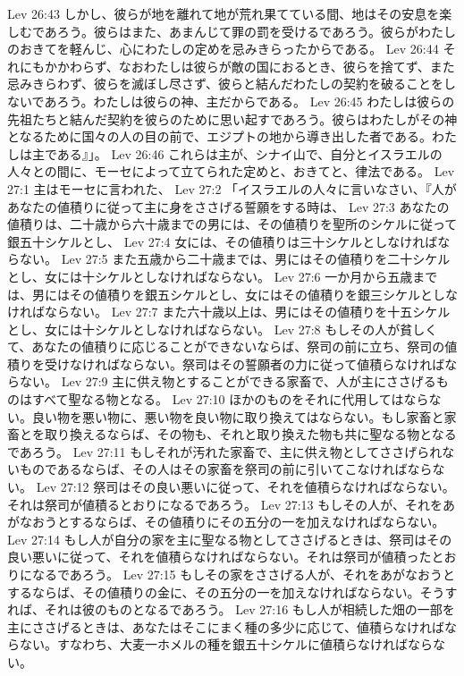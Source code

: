Lev 26:43  しかし、彼らが地を離れて地が荒れ果てている間、地はその安息を楽しむであろう。彼らはまた、あまんじて罪の罰を受けるであろう。彼らがわたしのおきてを軽んじ、心にわたしの定めを忌みきらったからである。
Lev 26:44  それにもかかわらず、なおわたしは彼らが敵の国におるとき、彼らを捨てず、また忌みきらわず、彼らを滅ぼし尽さず、彼らと結んだわたしの契約を破ることをしないであろう。わたしは彼らの神、主だからである。
Lev 26:45  わたしは彼らの先祖たちと結んだ契約を彼らのために思い起すであろう。彼らはわたしがその神となるために国々の人の目の前で、エジプトの地から導き出した者である。わたしは主である』」。
Lev 26:46  これらは主が、シナイ山で、自分とイスラエルの人々との間に、モーセによって立てられた定めと、おきてと、律法である。
Lev 27:1  主はモーセに言われた、
Lev 27:2  「イスラエルの人々に言いなさい、『人があなたの値積りに従って主に身をささげる誓願をする時は、
Lev 27:3  あなたの値積りは、二十歳から六十歳までの男には、その値積りを聖所のシケルに従って銀五十シケルとし、
Lev 27:4  女には、その値積りは三十シケルとしなければならない。
Lev 27:5  また五歳から二十歳までは、男にはその値積りを二十シケルとし、女には十シケルとしなければならない。
Lev 27:6  一か月から五歳までは、男にはその値積りを銀五シケルとし、女にはその値積りを銀三シケルとしなければならない。
Lev 27:7  また六十歳以上は、男にはその値積りを十五シケルとし、女には十シケルとしなければならない。
Lev 27:8  もしその人が貧しくて、あなたの値積りに応じることができないならば、祭司の前に立ち、祭司の値積りを受けなければならない。祭司はその誓願者の力に従って値積らなければならない。
Lev 27:9  主に供え物とすることができる家畜で、人が主にささげるものはすべて聖なる物となる。
Lev 27:10  ほかのものをそれに代用してはならない。良い物を悪い物に、悪い物を良い物に取り換えてはならない。もし家畜と家畜とを取り換えるならば、その物も、それと取り換えた物も共に聖なる物となるであろう。
Lev 27:11  もしそれが汚れた家畜で、主に供え物としてささげられないものであるならば、その人はその家畜を祭司の前に引いてこなければならない。
Lev 27:12  祭司はその良い悪いに従って、それを値積らなければならない。それは祭司が値積るとおりになるであろう。
Lev 27:13  もしその人が、それをあがなおうとするならば、その値積りにその五分の一を加えなければならない。
Lev 27:14  もし人が自分の家を主に聖なる物としてささげるときは、祭司はその良い悪いに従って、それを値積らなければならない。それは祭司が値積ったとおりになるであろう。
Lev 27:15  もしその家をささげる人が、それをあがなおうとするならば、その値積りの金に、その五分の一を加えなければならない。そうすれば、それは彼のものとなるであろう。
Lev 27:16  もし人が相続した畑の一部を主にささげるときは、あなたはそこにまく種の多少に応じて、値積らなければならない。すなわち、大麦一ホメルの種を銀五十シケルに値積らなければならない。
